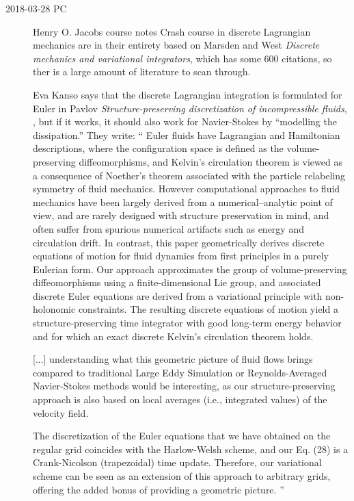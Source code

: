 \begin{description}
\item[2018-03-28 PC]

 {Henry O. Jacobs}
course notes
{Crash course in discrete {Lagrangian} mechanics}
are in their entirety based on Marsden and West {\em Discrete
mechanics and variational integrators}, which has some 600 citations, so ther
is a large amount of literature to scan through.

Eva Kanso says that the discrete {Lagrangian} integration is formulated for
Euler in Pavlov {\em Structure-preserving discretization of
incompressible fluids}, , but if it works, it should also
work for Navier-Stokes by ``modelling the dissipation.''
They write: ``
Euler fluids have Lagrangian and
Hamiltonian descriptions, where the configuration space is
defined as the volume-preserving diffeomorphisms, and Kelvin's circulation
theorem is viewed as a consequence of Noether's theorem associated with the
particle relabeling symmetry of fluid mechanics. However computational
approaches to fluid mechanics have been largely derived from a
numerical–analytic point of view, and are rarely designed with structure
preservation in mind, and often suffer from spurious numerical artifacts such
as energy and circulation drift. In contrast, this paper geometrically
derives discrete equations of motion for fluid dynamics from first principles
in a purely Eulerian form. Our approach approximates the group of
volume-preserving diffeomorphisms using a finite-dimensional Lie group, and
associated discrete Euler equations are derived from a variational principle
with non-holonomic constraints. The resulting discrete equations of motion
yield a structure-preserving time integrator with good long-term energy
behavior and for which an exact discrete Kelvin's circulation theorem
holds.

[...] understanding  what  this  geometric  picture  of  fluid  flows brings
compared to traditional Large Eddy Simulation or Reynolds-Averaged
Navier-\-Stokes methods would be interesting, as our structure-preserving
approach is also based on local averages (i.e., integrated values) of the
velocity field.


The discretization of the Euler equations that we have obtained on the
regular grid coincides with the Harlow-Welsh scheme, and our Eq.
(28) is a Crank-\-Nicolson (trapezoidal) time update.  Therefore, our
variational scheme can be seen as  an  extension  of  this  approach  to
arbitrary  grids,  offering  the  added  bonus  of providing a geometric
picture.
''



\end{description}
